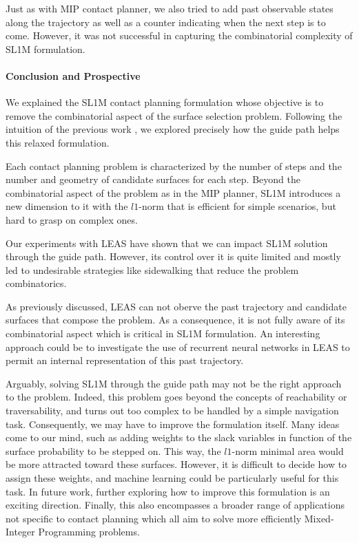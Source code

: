 Just as with MIP contact planner, we also tried to add past observable states along the trajectory as well as a counter indicating when the next step is to come.
However, it was not successful in capturing the combinatorial complexity of SL1M formulation.


\paragraph{Conclusion and Prospective}

We explained the SL1M contact planning formulation whose objective is to remove the combinatorial aspect of the surface selection problem.
Following the intuition of the previous work \cite{sl1m_v2}, we explored precisely how the guide path helps this relaxed formulation.

Each contact planning problem is characterized by the number of steps and the number and geometry of candidate surfaces for each step.
Beyond the combinatorial aspect of the problem as in the MIP planner, SL1M introduces a new dimension to it with the $l1$-norm that is efficient for simple scenarios, but hard to grasp on complex ones.

Our experiments with LEAS have shown that we can impact SL1M solution through the guide path.
However, its control over it is quite limited and mostly led to undesirable strategies like sidewalking that reduce the problem combinatorics.

As previously discussed, LEAS can not oberve the past trajectory and candidate surfaces that compose the problem. As a consequence, it is not fully aware of its combinatorial aspect which is critical in SL1M formulation.
An interesting approach could be to investigate the use of recurrent neural networks in LEAS to permit an internal representation of this past trajectory.

Arguably, solving SL1M through the guide path may not be the right approach to the problem.
Indeed, this problem goes beyond the concepts of reachability or traversability, and turns out too complex to be handled by a simple navigation task.
Consequently, we may have to improve the formulation itself.
Many ideas come to our mind, such as adding weights to the slack variables in function of the surface probability to be stepped on.
This way, the $l1$-norm minimal area would be more attracted toward these surfaces. 
However, it is difficult to decide how to assign these weights, and machine learning could be particularly useful for this task.
In future work, further exploring how to improve this formulation is an exciting direction. 
Finally, this also encompasses a broader range of applications not specific to contact planning which all aim to solve more efficiently Mixed-Integer Programming problems.